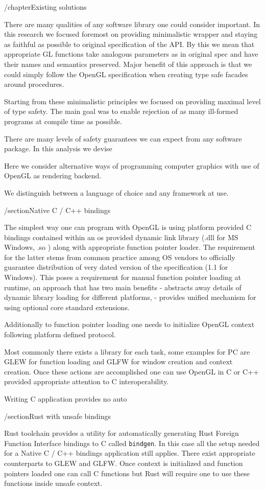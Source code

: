/chapter{Existing solutions}


There are many qualities of any software library one could consider important.
In this research we focused foremost on providing minimalistic wrapper and staying as faithful as possible to original specification of the API.
By this we mean that appropriate GL functions take analogous parameters as in original spec and have their names and semantics preserved.
Major benefit of this approach is that we could simply follow the OpenGL specification when creating type safe facades around procedures.

Starting from these minimalistic principles we focused on providing maximal level of type safety. The main goal was to enable rejection of as many ill-formed programs at compile time as possible.



There are many levels of safety guarantees we can expect from any software package.
In this analysis we devise 


Here we consider alternative ways of programming computer graphics with use of OpenGL as rendering backend.

We distinguish between a language of choice and any framework at use. 

/section{Native C / C++ bindings}

The simplest way one can program with OpenGL is using platform provided C bindings contained within an os provided dynamic link library (.dll for MS Windows, .so ) along with appropriate function pointer loader.
The requirement for the latter stems from common practice among OS vendors to officially guarantee distribution of very dated version of the specification (1.1 for Windows).
This poses a requirement for manual function pointer loading at runtime, an approach that has two main benefits
- abstracts away details of dynamic library loading for different platforms, 
- provides unified mechanism for using optional core standard extensions.

Additionally to function pointer loading one needs to initialize OpenGL context following platform defined protocol.

Most commonly there exists a library for each task, some examples for PC are GLEW for function loading and GLFW for window creation and context creation.
Once these actions are accomplished one can use OpenGL in C or C++ provided appropriate attention to C interoperability.

Writing C application provides no auto

/section{Rust with unsafe bindings}

Rust toolchain provides a utility for automatically generating Rust Foreign Function Interface bindings to C called \texttt{bindgen}.
In this case all the setup needed for a Native C / C++ bindings application still applies. There exist appropriate counterparts to GLEW and GLFW.
Once context is initialized and function pointers loaded one can call C functions but Rust will require one to use these functions inside unsafe context.
